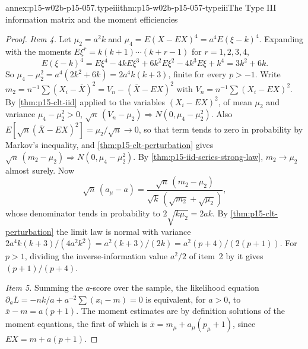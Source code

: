 \begin{annexitem}{annex:p15-w02b-p15-057.typeiii}{thm:p15-w02b-p15-057-typeiii}{The Type III information matrix and the moment efficiencies}
\begin{proof}
\emph{Item 4.} Let \(\mu_2=a^2k\) and \(\mu_4=E(X-EX)^4=a^4E(\xi-k)^4\).
Expanding with the moments \(E\xi^r=k(k+1)\cdots(k+r-1)\) for
\(r=1,2,3,4\),
\[
 E(\xi-k)^4=E\xi^4-4kE\xi^3+6k^2E\xi^2-4k^3E\xi+k^4=3k^2+6k .
\]
So \(\mu_4-\mu_2^2=a^4(2k^2+6k)=2a^4k(k+3)\), finite for every \(p>-1\).
Write \(m_2=n^{-1}\sum(X_i-\overline X)^2=V_n-(\overline X-EX)^2\) with
\(V_n=n^{-1}\sum(X_i-EX)^2\). By \cref{thm:p15-clt-iid} applied to the
variables \((X_i-EX)^2\), of mean \(\mu_2\) and variance
\(\mu_4-\mu_2^2>0\),
\(\sqrt n\,(V_n-\mu_2)\Rightarrow N(0,\mu_4-\mu_2^2)\). Also
\(E[\sqrt n(\overline X-EX)^2]=\mu_2/\sqrt n\to0\), so that term tends to
zero in probability by Markov's inequality, and
\cref{thm:p15-clt-perturbation} gives
\(\sqrt n\,(m_2-\mu_2)\Rightarrow N(0,\mu_4-\mu_2^2)\). By
\cref{thm:p15-iid-series-strong-law}, \(m_2\to\mu_2\) almost surely. Now
\[
 \sqrt n\,(a_\mu-a)=\frac{\sqrt n\,(m_2-\mu_2)}
 {\sqrt{k}\,(\sqrt{m_2}+\sqrt{\mu_2})},
\]
whose denominator tends in probability to \(2\sqrt{k\mu_2}=2a k\). By
\cref{thm:p15-clt-perturbation} the limit law is normal with variance
\(2a^4k(k+3)/(4a^2k^2)=a^2(k+3)/(2k)=a^2(p+4)/(2(p+1))\). For \(p>1\),
dividing the inverse-information value \(a^2/2\) of item~2 by it gives
\((p+1)/(p+4)\).

\emph{Item 5.} Summing the \(a\)-score over the sample, the likelihood
equation \(\partial_aL=-nk/a+a^{-2}\sum(x_i-m)=0\) is equivalent, for
\(a>0\), to \(\overline x-m=a(p+1)\). The moment estimates are by
definition solutions of the moment equations, the first of which is
\(\overline x=m_\mu+a_\mu(p_\mu+1)\), since \(EX=m+a(p+1)\).
\end{proof}
\end{annexitem}

